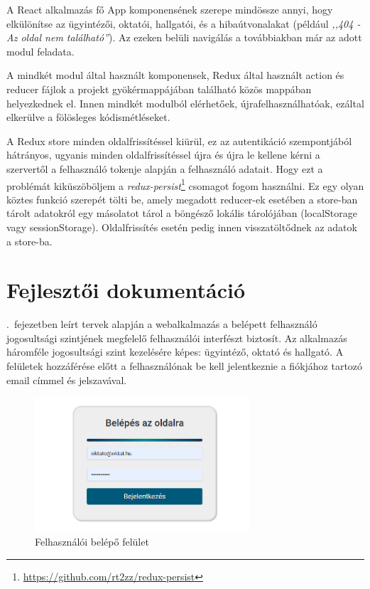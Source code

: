 \documentclass[
]{thesis-ekf}
\theoremstyle{definition}
\theoremstyle{remark}
\begin{document}
	A React alkalmazás fő App komponensének szerepe mindössze annyi, hogy elkülönítse az ügyintézői, oktatói, hallgatói, és a hibaútvonalakat (például \emph{,,404 - Az oldal nem található''}). Az ezeken belüli navigálás a továbbiakban már az adott modul feladata. 
	
	A mindkét modul által használt komponensek, Redux által használt action és reducer fájlok a projekt gyökérmappájában található közös mappában helyezkednek el. Innen mindkét modulból elérhetőek, újrafelhasználhatóak, ezáltal elkerülve a fölösleges kódismétléseket.
	
	A Redux store minden oldalfrissítéssel kiürül, ez az autentikáció szempontjából hátrányos, ugyanis minden oldalfrissítéssel újra és újra le kellene kérni a szervertől a felhasználó tokenje alapján a felhasználó adatait. Hogy ezt a problémát kiküszöböljem a \emph{redux-persist}\footnote{\url{https://github.com/rt2zz/redux-persist}} csomagot fogom használni. Ez egy olyan köztes funkció szerepét tölti be, amely megadott reducer-ek esetében a store-ban tárolt adatokról egy másolatot tárol a böngésző lokális tárolójában (localStorage vagy sessionStorage). Oldalfrissítés esetén pedig innen visszatöltődnek az adatok a store-ba.
	
	\chapter{Fejlesztői dokumentáció}
	\Az{\ref{chp:specifikacio}}.~fejezetben leírt tervek alapján a webalkalmazás a belépett felhasználó jogosultsági szintjének megfelelő felhasználói interfészt biztosít. Az alkalmazás háromféle jogosultsági szint kezelésére képes: ügyintéző, oktató és hallgató. A felületek hozzáférése előtt a felhasználónak be kell jelentkeznie a fiókjához tartozó email címmel és jelszavával.
	
	\begin{figure}[!h]
		\centering
		\includegraphics[width=8cm]{kepek/screenshots/belepes.png}
		\caption{Felhasználói belépő felület}
		\label{fig:belepes}
	\end{figure}
	
\end{document}

